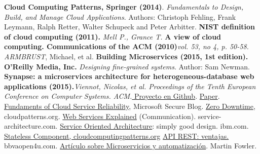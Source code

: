 \begin{thebibliography}{1}
\textbf{Cloud Computing Patterns, Springer (2014)}. \textit{Fundamentals to Design, Build, and Manage Cloud Applications}. Authors: Christoph Fehling, Frank Leymann, Ralph Retter, Walter Schupeck and Peter Arbitter.
\textbf{NIST definition of cloud computing (2011).} \textit{Mell P., Grance T.}
\textbf{A view of cloud computing. Communications of the ACM (2010)}\textit{vol. 53, no 4, p. 50-58. ARMBRUST}, Michael, et al.
\textbf{Building Microservices (2015, 1st edition). O'Reilly Media, Inc.} \textit{Designing fine-grained systems}. Author: Sam Newman.
\textbf{Synapse: a microservices architecture for heterogeneous-database web applications (2015).}\textit{Viennot, Nicolas, et al. Proceedings of the Tenth European Conference on Computer Systems. ACM.}\href{https://github.com/nviennot/synapse}{ Proyecto en Github}. \href{http://viennot.com/synapse.pdf}{Paper}.
\href{https://blogs.microsoft.com/microsoftsecure/2012/09/12/fundamentals-of-cloud-service-reliability/}{Fundaments of Cloud Service Reliability}, Microsoft Secure Blog.
\href{http://cloudpatterns.org/design_patterns/zero_downtime}{Zero Downtime}, cloudpatterns.org.
\href{http://www.service-architecture.com/articles/web-services/web_services_explained.html}{Web Services Explained} (Communication). service-architecture.com.
\href{https://www-01.ibm.com/software/solutions/soa/}{Service Oriented Architecture}: simply good design. ibm.com.
\href{http://www.cloudcomputingpatterns.org/stateless_component/}{Stateless Component, cloudcomputingpatterns.org}
\href{https://bbvaopen4u.com/es/actualidad/api-rest-que-es-y-cuales-son-sus-ventajas-en-el-desarrollo-de-proyectos}{API REST: ventajas.}  bbvaopen4u.com.
\href{https://martinfowler.com/articles/microservices.html}{Artículo sobre Microservicios y automatización}. Martin Fowler.
\end{thebibliography}

